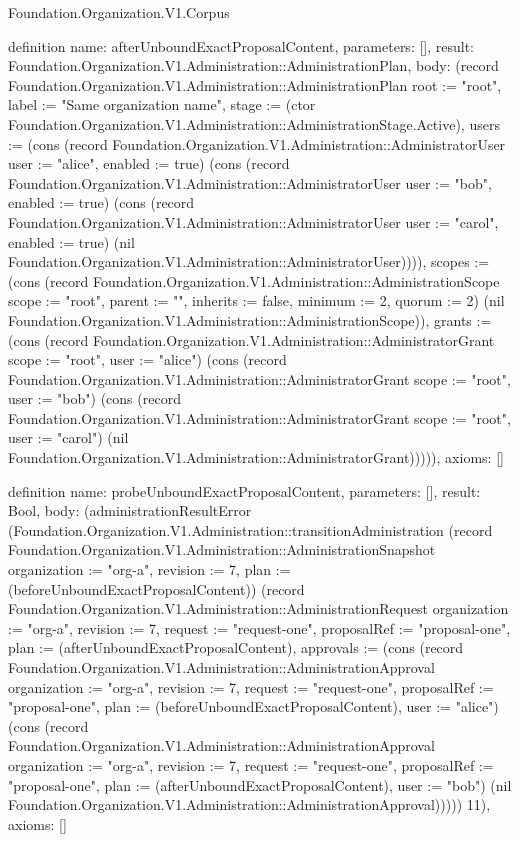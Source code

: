 \begin{lexlean}{Foundation.Organization.V1.Corpus}
\begin{semanticmodule}
definition{
  name: afterUnboundExactProposalContent,
  parameters: [],
  result: Foundation.Organization.V1.Administration::AdministrationPlan,
  body: (record Foundation.Organization.V1.Administration::AdministrationPlan {root := "root", label := "Same organization name", stage := (ctor Foundation.Organization.V1.Administration::AdministrationStage.Active), users := (cons (record Foundation.Organization.V1.Administration::AdministratorUser {user := "alice", enabled := true}) (cons (record Foundation.Organization.V1.Administration::AdministratorUser {user := "bob", enabled := true}) (cons (record Foundation.Organization.V1.Administration::AdministratorUser {user := "carol", enabled := true}) (nil Foundation.Organization.V1.Administration::AdministratorUser)))), scopes := (cons (record Foundation.Organization.V1.Administration::AdministrationScope {scope := "root", parent := "", inherits := false, minimum := 2, quorum := 2}) (nil Foundation.Organization.V1.Administration::AdministrationScope)), grants := (cons (record Foundation.Organization.V1.Administration::AdministratorGrant {scope := "root", user := "alice"}) (cons (record Foundation.Organization.V1.Administration::AdministratorGrant {scope := "root", user := "bob"}) (cons (record Foundation.Organization.V1.Administration::AdministratorGrant {scope := "root", user := "carol"}) (nil Foundation.Organization.V1.Administration::AdministratorGrant))))}),
  axioms: []
}

definition{
  name: probeUnboundExactProposalContent,
  parameters: [],
  result: Bool,
  body: (administrationResultError (Foundation.Organization.V1.Administration::transitionAdministration (record Foundation.Organization.V1.Administration::AdministrationSnapshot {organization := "org-a", revision := 7, plan := (beforeUnboundExactProposalContent)}) (record Foundation.Organization.V1.Administration::AdministrationRequest {organization := "org-a", revision := 7, request := "request-one", proposalRef := "proposal-one", plan := (afterUnboundExactProposalContent), approvals := (cons (record Foundation.Organization.V1.Administration::AdministrationApproval {organization := "org-a", revision := 7, request := "request-one", proposalRef := "proposal-one", plan := (beforeUnboundExactProposalContent), user := "alice"}) (cons (record Foundation.Organization.V1.Administration::AdministrationApproval {organization := "org-a", revision := 7, request := "request-one", proposalRef := "proposal-one", plan := (afterUnboundExactProposalContent), user := "bob"}) (nil Foundation.Organization.V1.Administration::AdministrationApproval)))})) 11),
  axioms: []
}


\end{semanticmodule}
\end{lexlean}
